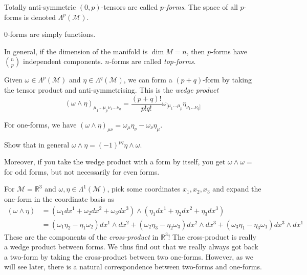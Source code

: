 \begin{definition}[p-forms]
  Totally anti-symmetric $(0, p)$-tensors are called \emph{$p$-forms}. The space of all $p$-forms is denoted $\Lambda^p (\mathcal{M})$.
\end{definition}
\begin{example}[]
  $0$-forms are simply functions.
\end{example}
In general, if the dimension of the manifold is $\dim M = n$, then $p$-forms have $\binom{n}{p}$ independent components.
$n$-forms are called \emph{top-forms}.
\begin{definition}
  Given $\omega \in \Lambda^p(\mathcal{M})$ and $\eta \in \Lambda^q (\mathcal{M})$, we can form a $(p + q)$-form by taking the tensor product and anti-symmetrising.
  This is the \emph{wedge product}
  \begin{equation}
    (\omega \wedge \eta)_{\mu_1 \dots \mu_p \nu_1 \dots \nu_q} = \frac{(p + q)!}{p! q!} \omega_{[\mu_1 \dots \mu_p} \eta_{\nu_1 \dots \nu_q]}
  \end{equation}
\end{definition}
\begin{example}[]
  For one-forms, we have $(\omega \wedge \eta)_{\mu\nu} = \omega_\mu \eta_\nu - \omega_\nu \eta_\mu$.
\end{example}
\begin{exercise}
  Show that in general $\omega \wedge \eta = (-1)^{pq} \eta \wedge \omega$.
\end{exercise}
Moreover, if you take the wedge product with a form by itself, you get $\omega \wedge \omega = $ for odd forms, but not necessarily for even forms.

\begin{example}
  For $\mathcal{M} = \mathbb{R}^3$ and $\omega, \eta \in \Lambda^1(\mathcal{M})$, pick some coordinates $x_1, x_2, x_3$ and expand the one-form in the coordinate basis as
  \begin{align}
    (\omega \wedge \eta) &= (\omega_1 dx^1 + \omega_2 dx^2 + \omega_3 dx^3) \wedge (\eta_1 dx^1 + \eta_2 dx^2 + \eta_3 dx^3) \\
			 &= (\omega_1 \eta_2 - \eta_1 \omega_2) dx^1 \wedge dx^2
			 + (\omega_2 \eta_3 - \eta_2 \omega_3) dx^2 \wedge dx^3
			 + (\omega_3 \eta_1 - \eta_3 \omega_1) dx^3 \wedge dx^1 
  \end{align}
  These are the components of the \emph{cross-product} in $\mathbb{R}^3$!
  The cross-product is really a wedge product between forms.
  We thus find out that we really always got back a two-form by taking the cross-product between two one-forms. However, as we will see later, there is a natural correspondence between two-forms and one-forms.
\end{example}

